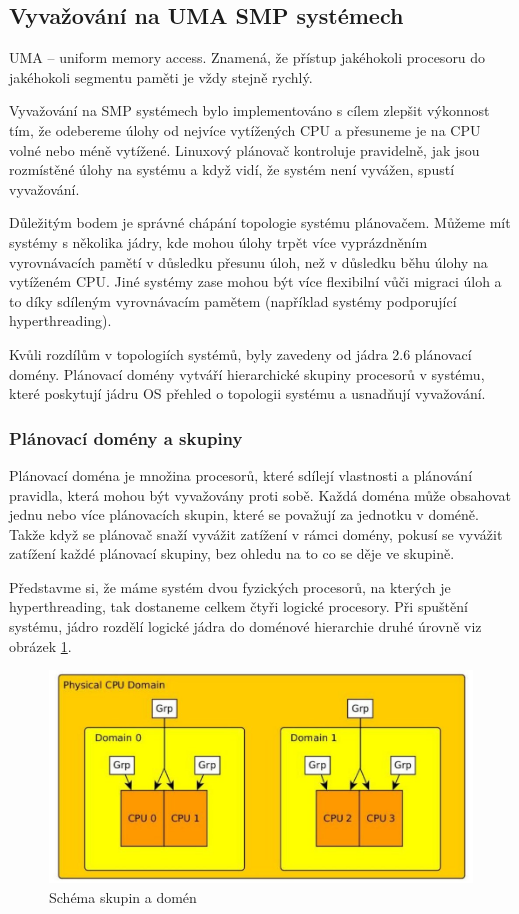 \documentclass[
  master=true,
  font=sans,
  printversion=false,
  joinlists=true,
  figures=true,
  tables=true,
  sourcecodes=false,
  theorems=false,
  bibencoding=utf8,
  language=czech,
  encoding=utf8,
  field=ainfk,
  biblatex,
  glossaries,
  index
]{kidiplom}
\begin{document}
\subsection{Vyvažování na UMA SMP systémech}

UMA – uniform memory access. Znamená, že přístup jakéhokoli procesoru do jakéhokoli segmentu paměti je vždy stejně rychlý.

Vyvažování na SMP systémech bylo implementováno s cílem zlepšit výkonnost tím, že odebereme úlohy od nejvíce vytížených CPU a přesuneme je na CPU volné nebo méně vytížené. Linuxový plánovač kontroluje pravidelně, jak jsou rozmístěné úlohy na systému a když vidí, že systém není vyvážen, spustí vyvažování.

Důležitým bodem je správné chápání topologie systému plánovačem. Můžeme mít systémy s několika jádry, kde mohou úlohy trpět více vyprázdněním vyrovnávacích pamětí v důsledku přesunu úloh, než v důsledku běhu úlohy na vytíženém CPU. Jiné systémy zase mohou být více flexibilní vůči migraci úloh a to díky sdíleným vyrovnávacím pamětem (například systémy podporující hyperthreading).

Kvůli rozdílům v topologiích systémů, byly zavedeny od jádra 2.6 plánovací domény. Plánovací domény vytváří hierarchické skupiny procesorů v systému, které poskytují jádru OS přehled o topologii systému a usnadňují vyvažování.

\newpage
\subsubsection{Plánovací domény a skupiny}

Plánovací doména je množina procesorů, které sdílejí vlastnosti a plánování pravidla, která mohou být vyvažovány proti sobě. Každá doména může obsahovat jednu nebo více plánovacích skupin, které se považují za jednotku v doméně. Takže když se plánovač snaží vyvážit zatížení v rámci domény, pokusí se vyvážit zatížení každé plánovací skupiny, bez ohledu na to co se děje ve skupině.

Představme si, že máme systém dvou fyzických procesorů, na kterých je hyperthreading, tak dostaneme celkem čtyři logické procesory. Při spuštění systému, jádro rozdělí logické jádra do doménové hierarchie druhé úrovně viz obrázek \ref{domeny a skupiny}.

\begin{figure}[ht]
\includegraphics[scale=0.53]{obrazky/domenyAskupiny.jpeg}
\caption{Schéma skupin a domén}
\label{domeny a skupiny}
\end{figure}
\end{document}
